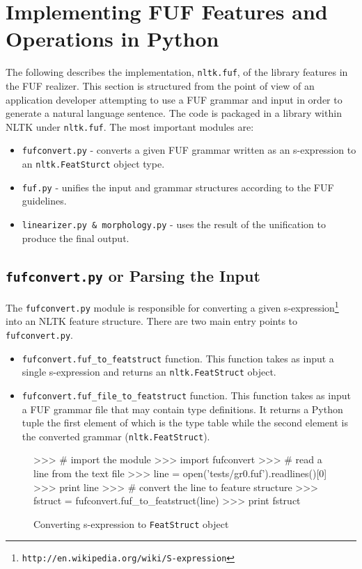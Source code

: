 \documentclass[12pt]{article}
\begin{document}
{\section{Implementing FUF Features and Operations in Python}
The following describes the implementation, \texttt{nltk.fuf}, of the library features in the FUF realizer. 
This section is structured from the point of view of an application developer attempting to use a 
FUF grammar and input in order to generate a natural language sentence. The code is packaged in a library
within NLTK under \texttt{nltk.fuf}. The most important modules are:
\begin{itemize}
    \item \texttt{fufconvert.py} - converts a given FUF grammar written as an s-expression to an \texttt{nltk.FeatSturct} 
        object type.
    \item \texttt{fuf.py} - unifies the input and grammar structures according to the FUF guidelines.
    \item \texttt{linearizer.py \& morphology.py} - uses the result of the unification to produce the final output.
\end{itemize}

\subsection{\texttt{fufconvert.py} or Parsing the Input}
The \texttt{fufconvert.py} module is responsible for converting a given s-expression\footnote{\texttt{\footnotesize http://en.wikipedia.org/wiki/S-expression}}
into an NLTK feature structure.
There are two main entry points to \texttt{fufconvert.py}.
\begin{itemize}
    \item \texttt{fufconvert.fuf\_to\_featstruct} function. This function takes as input a single s-expression and returns
        an \texttt{nltk.FeatStruct} object.
    \item \texttt{fufconvert.fuf\_file\_to\_featstruct} function. This function takes as input a FUF grammar file 
        that may contain type definitions. It returns a Python tuple the first element of which is the type table
        while the second element is the converted grammar (\texttt{nltk.FeatStruct}).
\end{itemize}

\begin{figure}[h!]
{\small
\begin{listing}{1}
>>> # import the module
>>> import fufconvert
>>> # read a line from the text file
>>> line = open('tests/gr0.fuf').readlines()[0]
>>> print line
>>> # convert the line to feature structure
>>> fstruct = fufconvert.fuf_to_featstruct(line)
>>> print fstruct \end{listing} 
}
\caption{Converting s-expression to \texttt{FeatStruct} object}
\label{fig:convert-input}
\end{figure}

}
\end{document}
